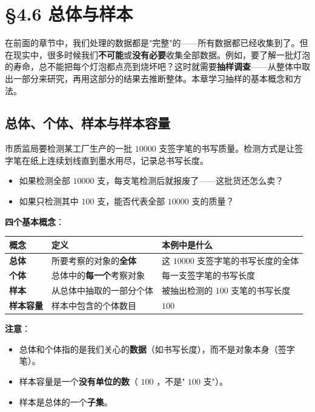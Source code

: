 \chapter{§4.6 总体与样本}
\label{sec:4.6}





在前面的章节中，我们处理的数据都是"完整"的——所有数据都已经收集到了。但在现实中，很多时候我们\textbf{不可能}或\textbf{没有必要}收集全部数据。例如，要了解一批灯泡的寿命，总不能把每个灯泡都点亮到烧坏吧？这时就需要\textbf{抽样调查}——从整体中取出一部分来研究，再用这部分的结果去推断整体。本章学习抽样的基本概念和方法。



\section*{总体、个体、样本与样本容量}


\begin{explore}


市质监局要检测某工厂生产的一批 $10000$ 支签字笔的书写质量。检测方式是让签字笔在纸上连续划线直到墨水用尽，记录总书写长度。

\begin{itemize}
  \item 如果检测全部 $10000$ 支，每支笔检测后就报废了——这批货还怎么卖？
  \item 如果只检测其中 $100$ 支，能否代表全部 $10000$ 支的质量？
\end{itemize}


\end{explore}

\begin{understand}


\textbf{四个基本概念}：

\begin{center}
\begin{tabular}{lll}
\toprule
概念 & 定义 & 本例中是什么 \\
\midrule
\textbf{总体} & 所要考察的对象的\textbf{全体} & 这 $10000$ 支签字笔的书写长度的全体 \\
\textbf{个体} & 总体中的\textbf{每一个}考察对象 & 每一支签字笔的书写长度 \\
\textbf{样本} & 从总体中抽取的一部分个体 & 被抽出检测的 $100$ 支笔的书写长度 \\
\textbf{样本容量} & 样本中包含的个体数目 & $100$ \\
\bottomrule
\end{tabular}
\end{center}


\textbf{注意}：
\begin{itemize}
  \item 总体和个体指的是我们关心的\textbf{数据}（如书写长度），而不是对象本身（签字笔）。
  \item 样本容量是一个\textbf{没有单位的数}（ $100$ ，不是" $100$ 支"）。
  \item 样本是总体的一个\textbf{子集}。
\end{itemize}


\end{understand}

